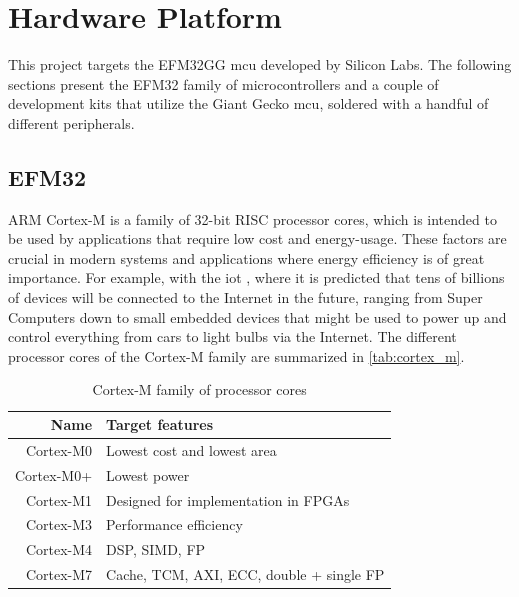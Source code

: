 \section{Hardware Platform}
\label{sec:back:hw}

This project targets the EFM32GG \gls{mcu} developed by Silicon Labs.
The following sections present the EFM32 family of microcontrollers and a couple of development kits that utilize the Giant Gecko \gls{mcu}, soldered with a handful of different peripherals.

\subsection{EFM32}
\label{sub:emf32}

ARM Cortex-M is a family of 32-bit RISC processor cores, which is intended to be used by applications that require low cost and energy-usage.
These factors are crucial in modern systems and applications where energy efficiency is of great importance.
For example, with the \gls{iot} \cite{Valhouli2010}, where it is predicted that tens of billions of devices will be connected to the Internet in the future, ranging from Super Computers down to small embedded devices that might be used to power up and control everything from cars to light bulbs via the Internet.
The different processor cores of the Cortex-M family are summarized in \autoref{tab:cortex_m}.

\begin{table}[h]
\begin{center}
\begin{tabular}{r|l}
    \textbf{Name} & \textbf{Target features}            \\
    \hline
    Cortex-M0 & Lowest cost and lowest area              \\
    Cortex-M0+ & Lowest power                            \\
    Cortex-M1 & Designed for implementation in FPGAs     \\
    Cortex-M3 & Performance efficiency                   \\
    Cortex-M4 & DSP, SIMD, FP                            \\
    Cortex-M7 & Cache, TCM, AXI, ECC, double + single FP \\
    \hline
    \end{tabular}
\end{center}
\caption{Cortex-M family of processor cores}
\label{tab:cortex_m}
\end{table}


